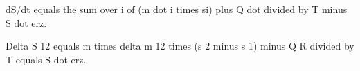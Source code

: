 dS/dt equals the sum over i of (m dot i times si) plus Q dot divided by T minus S dot erz.  

Delta S 12 equals m times delta m 12 times (s 2 minus s 1) minus Q R divided by T equals S dot erz.